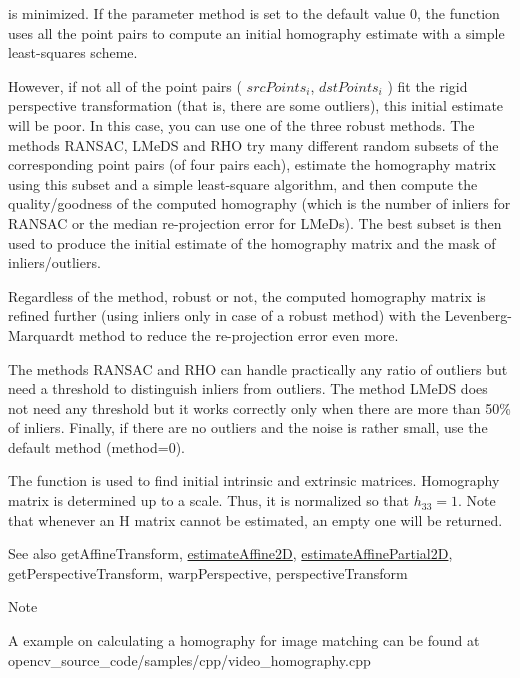 is minimized. If the parameter method is set to the default value 0, the function uses all the point pairs to compute an initial homography estimate with a simple least-\/squares scheme. 

However, if not all of the point pairs ( $srcPoints_i$, $dstPoints_i$ ) fit the rigid perspective transformation (that is, there are some outliers), this initial estimate will be poor. In this case, you can use one of the three robust methods. The methods R\+A\+N\+S\+AC, L\+Me\+DS and R\+HO try many different random subsets of the corresponding point pairs (of four pairs each), estimate the homography matrix using this subset and a simple least-\/square algorithm, and then compute the quality/goodness of the computed homography (which is the number of inliers for R\+A\+N\+S\+AC or the median re-\/projection error for L\+Me\+Ds). The best subset is then used to produce the initial estimate of the homography matrix and the mask of inliers/outliers. 

Regardless of the method, robust or not, the computed homography matrix is refined further (using inliers only in case of a robust method) with the Levenberg-\/\+Marquardt method to reduce the re-\/projection error even more. 

The methods R\+A\+N\+S\+AC and R\+HO can handle practically any ratio of outliers but need a threshold to distinguish inliers from outliers. The method L\+Me\+DS does not need any threshold but it works correctly only when there are more than 50\% of inliers. Finally, if there are no outliers and the noise is rather small, use the default method (method=0). 

The function is used to find initial intrinsic and extrinsic matrices. Homography matrix is determined up to a scale. Thus, it is normalized so that $h_{33}=1$. Note that whenever an H matrix cannot be estimated, an empty one will be returned. 

\begin{DoxySeeAlso}{See also}
get\+Affine\+Transform, \hyperlink{group__calib3d_ga3ac5c98614a2c26448c68e407388473f}{estimate\+Affine2D}, \hyperlink{group__calib3d_gab4e1d79cab0ae6448de411f9688836c8}{estimate\+Affine\+Partial2D}, get\+Perspective\+Transform, warp\+Perspective, perspective\+Transform 
\end{DoxySeeAlso}


\begin{DoxyNote}{Note}

\begin{DoxyItemize}
\item A example on calculating a homography for image matching can be found at opencv\+\_\+source\+\_\+code/samples/cpp/video\+\_\+homography.\+cpp 
\end{DoxyItemize}
\end{DoxyNote}
\mbox{\label{group__calib3d_ga7460fd1ec11b17261dc7b2208a1f2d9f}} 

